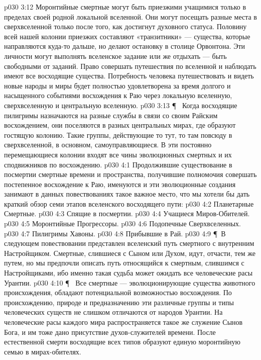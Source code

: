 \vs p030 3:12 Моронтийные смертные могут быть приезжими учащимися только в пределах своей родной локальной вселенной. Они могут посещать разные места в сверхвселенной только после того, как достигнут духовного статуса. Половину всей нашей колонии приезжих составляют «транзитники» --- существа, которые направляются куда\hyp{}то дальше, но делают остановку в столице Орвонтона. Эти личности могут выполнять вселенское задание или же отдыхать --- быть свободными от заданий. Право совершать путешествия по вселенной и наблюдать имеют все восходящие существа. Потребность человека путешествовать и видеть новые народы и миры будет полностью удовлетворена за время долгого и насыщенного событиями восхождения к Раю через локальную вселенную, сверхвселенную и центральную вселенную.
\vs p030 3:13 \P\ \bibnobreakspace {} Когда восходящие пилигримы назначаются на разные службы в связи со своим Райским восхождением, они поселяются в разных центральных мирах, где образуют гостящую колонию. Такие группы, действующие то тут, то там повсюду в сверхвселенной, в основном, самоуправляющиеся. В эти постоянно перемещающиеся колонии входят все чины эволюционных смертных и их сподвижников по восхождению.
\vs p030 4:1 Продолжившие существование в посмертии смертные времени и пространства, получившие полномочия совершать постепенное восхождение к Раю, именуются  и эти эволюционные создания занимают в данных повествованиях такое важное место, что мы хотели бы дать краткий обзор семи этапов вселенского восходящего пути:
\vs p030 4:2 \bibnobreakspace Планетарные Смертные.
\vs p030 4:3 \bibnobreakspace Спящие в посмертии.
\vs p030 4:4 \bibnobreakspace Учащиеся Миров\hyp{}Обителей.
\vs p030 4:5 \bibnobreakspace Моронтийные Прогрессоры.
\vs p030 4:6 \bibnobreakspace Подопечные Сверхвселенных.
\vs p030 4:7 \bibnobreakspace Пилигримы Хавоны.
\vs p030 4:8 \bibnobreakspace Прибывшие в Рай.
\vs p030 4:9 \P\ В следующем повествовании представлен вселенский путь смертного с внутренним Настройщиком. Смертные, слившиеся с Сыном или Духом, идут, отчасти, тем же путем, но мы предпочли описать путь относящийся к смертным, слившимся с Настройщиками, ибо именно такая судьба может ожидать все человеческие расы Урантии.
\vs p030 4:10 \P\ \bibnobreakspace {} Все смертные --- эволюционирующие существа животного происхождения, обладают потенциальной возможностью восхождения. По происхождению, природе и предназначению эти различные группы и типы человеческих существ не слишком отличаются от народов Урантии. На человеческие расы каждого мира распространяется такое же служение Сынов Бога, и им тоже дано присутствие духов\hyp{}служителей времени. После естественной смерти восходящие всех типов образуют единую моронтийную семью в мирах\hyp{}обителях.
